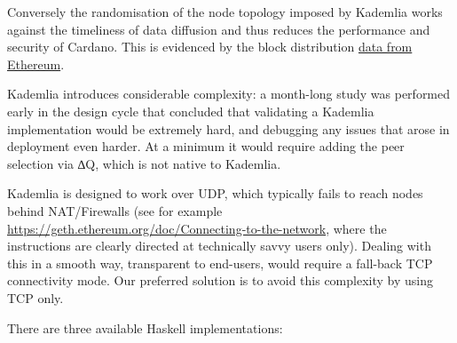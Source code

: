 \documentclass[]{article}
\begin{document}
Conversely the randomisation of the node topology imposed by Kademlia
works against the timeliness of data diffusion and thus reduces the
performance and security of Cardano. This is evidenced by the block
distribution \protect\hyperlink{ethereum}{{data from Ethereum}}.

Kademlia introduces considerable complexity: a month-long study was
performed early in the design cycle that concluded that validating a
Kademlia implementation would be extremely hard, and debugging any
issues that arose in deployment even harder. At a minimum it would
require adding the peer selection via ∆Q, which is not native to
Kademlia.

Kademlia is designed to work over UDP, which typically fails to reach
nodes behind NAT/Firewalls (see for example
\href{https://geth.ethereum.org/doc/Connecting-to-the-network}{{https://geth.ethereum.org/doc/Connecting-to-the-network}},
where the instructions are clearly directed at technically savvy users
only). Dealing with this in a smooth way, transparent to end-users,
would require a fall-back TCP connectivity mode. Our preferred solution
is to avoid this complexity by using TCP only.

There are three available Haskell implementations:
\end{document}

